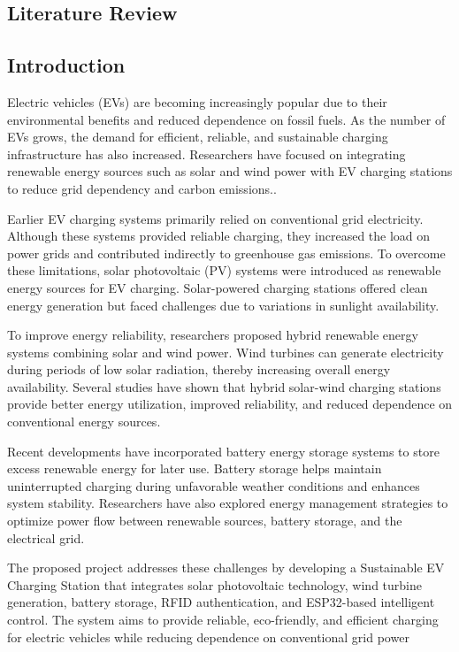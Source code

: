 \documentclass[12pt]{report}
\begin{document}
\begin{Certificatepage}
\begin{center}
\begin{justify}
\chapter{Literature Review}
\section{Introduction}
Electric vehicles (EVs) are becoming increasingly popular due to their environmental benefits and reduced dependence on fossil fuels. As the number of EVs grows, the demand for efficient, reliable, and sustainable charging infrastructure has also increased. Researchers have focused on integrating renewable energy sources such as solar and wind power with EV charging stations to reduce grid dependency and carbon emissions..

\vspace{10pt}
Earlier EV charging systems primarily relied on conventional grid electricity. Although these systems provided reliable charging, they increased the load on power grids and contributed indirectly to greenhouse gas emissions. To overcome these limitations, solar photovoltaic (PV) systems were introduced as renewable energy sources for EV charging. Solar-powered charging stations offered clean energy generation but faced challenges due to variations in sunlight availability.

\vspace{10pt}
To improve energy reliability, researchers proposed hybrid renewable energy systems combining solar and wind power. Wind turbines can generate electricity during periods of low solar radiation, thereby increasing overall energy availability. Several studies have shown that hybrid solar-wind charging stations provide better energy utilization, improved reliability, and reduced dependence on conventional energy sources.

\vspace{10pt}
Recent developments have incorporated battery energy storage systems to store excess renewable energy for later use. Battery storage helps maintain uninterrupted charging during unfavorable weather conditions and enhances system stability. Researchers have also explored energy management strategies to optimize power flow between renewable sources, battery storage, and the electrical grid.

\vspace{10pt}
The proposed project addresses these challenges by developing a Sustainable EV Charging Station that integrates solar photovoltaic technology, wind turbine generation, battery storage, RFID authentication, and ESP32-based intelligent control. The system aims to provide reliable, eco-friendly, and efficient charging for electric vehicles while reducing dependence on conventional grid power


\end{justify}
\end{center}
\end{Certificatepage}
\end{document}
